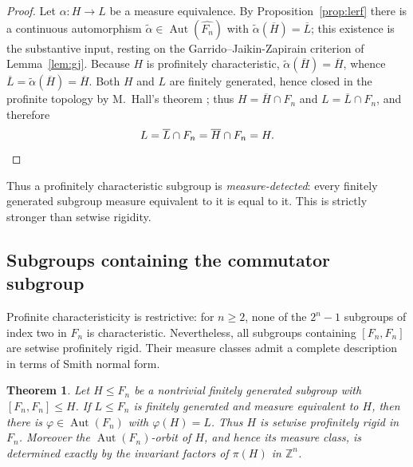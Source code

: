 \documentclass[11pt]{amsart}
\theoremstyle{plain}
\newtheorem{theorem}{Theorem}[section]
\theoremstyle{definition}
\newcommand{\Aut}{\operatorname{Aut}}
\begin{document}
\begin{proof}
Let $\alpha\colon H\to L$ be a measure equivalence.  By
Proposition~\ref{prop:lerf} there is a continuous automorphism
$\widetilde\alpha\in\Aut(\widehat{F_n})$ with
$\widetilde\alpha(\overline H)=\overline L$; this existence is the substantive
input, resting on the Garrido--Jaikin-Zapirain criterion of
Lemma~\ref{lem:gj}.  Because $H$ is profinitely characteristic,
$\widetilde\alpha(\overline H)=\overline H$, whence
$\overline L=\widetilde\alpha(\overline H)=\overline H$.  Both $H$ and $L$ are
finitely generated, hence closed in the profinite topology by M.~Hall's theorem
\cite{Hall}; thus $H=\overline H\cap F_n$ and $L=\overline L\cap F_n$, and
therefore
\[
  L=\overline L\cap F_n=\overline H\cap F_n=H. \qedhere
\]
\end{proof}

Thus a profinitely characteristic subgroup is \emph{measure-detected}: every
finitely generated subgroup measure equivalent to it is equal to it. This is
strictly stronger than setwise rigidity.


\subsection{Subgroups containing the commutator subgroup}\label{sec:commutator}


Profinite characteristicity is restrictive: for $n\ge2$, none of the
$2^n-1$ subgroups of index two in $F_n$ is characteristic. Nevertheless, all
subgroups containing $[F_n,F_n]$ are setwise profinitely rigid. Their measure
classes admit a complete description in terms of Smith normal form.

\begin{theorem}\label{thm:above-commutator}
Let $H\le F_n$ be a nontrivial finitely generated subgroup with
$[F_n,F_n]\le H$.  If $L\le F_n$ is finitely generated and measure equivalent to $H$, then
there is $\varphi\in\Aut(F_n)$ with $\varphi(H)=L$.  Thus $H$ is setwise
profinitely rigid in $F_n$.  Moreover the $\Aut(F_n)$-orbit of $H$, and hence its
measure class, is determined exactly by the invariant factors of
$\pi(H)$ in $\mathbb Z^{n}$.
\end{theorem}
\end{document}
